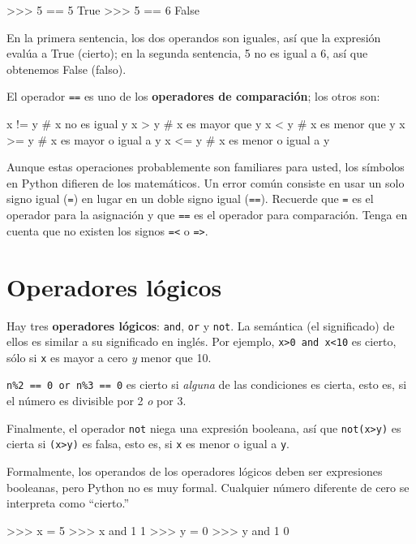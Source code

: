 \begin{pyconcode}
>>> 5 == 5
True
>>> 5 == 6
False
\end{pyconcode}
 En la primera sentencia, los dos operandos son iguales, así que la
expresión evalúa a True (cierto); en la segunda sentencia, 5 no es
igual a 6, así que obtenemos False (falso).

El operador \texttt{==} es uno de los \textbf{operadores de comparación};
los otros son:
\begin{pyconcode}
      x != y               # x no es igual y
      x > y                # x es mayor que y
      x < y                # x es menor que y
      x >= y               # x es mayor o igual a y
      x <= y               # x es menor o igual a y
\end{pyconcode}

Aunque estas operaciones probablemente son familiares para usted,
los símbolos en Python difieren de los matemáticos. Un error común
consiste en usar un solo signo igual (\texttt{=}) en lugar en un doble
signo igual (\texttt{==}). Recuerde que \texttt{=} es el operador
para la asignación y que \texttt{==} es el operador para comparación.
Tenga en cuenta que no existen los signos \texttt{=\textless{}} o
\texttt{=\textgreater{}}.

\section{Operadores lógicos}

 

Hay tres \textbf{operadores lógicos}: \texttt{and}, \texttt{or} y
\texttt{not}. La semántica (el significado) de ellos es similar a
su significado en inglés. Por ejemplo, \texttt{x\textgreater{}0 and
x\textless{}10} es cierto, sólo si \texttt{x} es mayor a cero {\em
y} menor que 10.

\texttt{n\%2 == 0 or n\%3 == 0} es cierto si {\em alguna} de las
condiciones es cierta, esto es, si el número es divisible por 2 {\em
o} por 3.

Finalmente, el operador \texttt{not} niega una expresión booleana,
así que \texttt{not(x\textgreater{}y)} es cierta si \texttt{(x\textgreater{}y)}
es falsa, esto es, si \texttt{x} es menor o igual a \texttt{y}.

Formalmente, los operandos de los operadores lógicos deben ser expresiones
booleanas, pero Python no es muy formal. Cualquier número diferente
de cero se interpreta como ``cierto.''
\begin{pyconcode}
>>>  x = 5
>>>  x and 1
1
>>>  y = 0
>>>  y and 1
0
\end{pyconcode}

